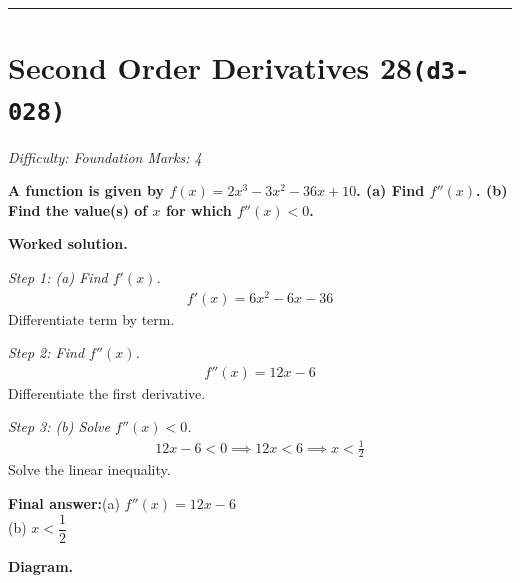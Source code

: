 \documentclass[11pt]{article}
\newcommand{\question}[1]{\par\medskip\noindent\textbf{#1}\par}
\begin{document}
\medskip\hrule

\section*{Second Order Derivatives 28\quad\small\texttt{(d3-028)}}
\textit{Difficulty: Foundation \quad\textbar\quad Marks: 4}

\question{A function is given by \( f(x) = 2x^3 - 3x^2 - 36x + 10 \). (a) Find \( f''(x) \). (b) Find the value(s) of \( x \) for which \( f''(x) < 0 \).}

\textbf{Worked solution.}

\textit{Step 1: (a) Find \( f'(x) \).}
\[\begin{gathered}
f'(x) = 6x^2 - 6x - 36
\end{gathered}\]
Differentiate term by term.

\textit{Step 2: Find \( f''(x) \).}
\[\begin{gathered}
f''(x) = 12x - 6
\end{gathered}\]
Differentiate the first derivative.

\textit{Step 3: (b) Solve \( f''(x) < 0 \).}
\[\begin{gathered}
12x - 6 < 0 \implies 12x < 6 \implies x < \tfrac{1}{2}
\end{gathered}\]
Solve the linear inequality.

\begin{answerbox}
\textbf{Final answer:}\quad (a) \(\displaystyle  f''(x) = 12x - 6 \) \\[3pt]  (b) \(\displaystyle  x < \dfrac{1}{2} \)
\end{answerbox}
\textbf{Diagram.}
\end{document}
